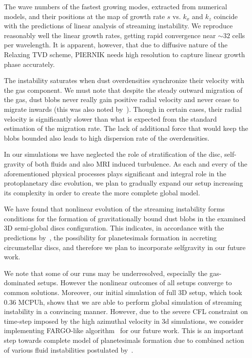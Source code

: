 \par The wave numbers of the fastest growing modes, extracted from numerical
models, and their positions at  the  map of growth rate  $s$ vs. $k_x$ and $k_z$
coincide with the predictions of linear analysis of streaming instability. We
reproduce reasonably well the linear growth rates, getting rapid convergence
near $\sim 32$ cells per wavelength. It is apparent, however,  that due to
diffusive nature of the Relaxing TVD scheme, PIERNIK needs high resolution to
capture linear growth phase accurately.

\par The instability saturates when dust overdensities synchronize their
velocity with the gas component. We must note that despite the steady outward
migration of the gas, dust blobs never really gain positive radial velocity and
never cease to migrate inwards (this was also noted by~\cite{JY07}). Though in
certain cases, their radial velocity is significantly slower than what is
expected from the standard estimation of the migration rate. The lack of
additional force that would keep the blobs bounded also leads to high dispersion
rate of the overdensities.

\par In our simulations we have neglected the role of stratification of the
disc, self-gravity of both fluids and also MRI induced turbulence. As each and
every of the aforementioned physical processes plays significant and integral
role in the protoplanetary disc evolution, we plan to gradually expand our setup
increasing its complexity in order to create the more complete global model.

\par We have found that nonlinear evolution of  the streaming instability forms
conditions for the formation  of gravitationally bound dust blobs in the
examined 3D semi-global discs configuration.  This indicates, in accordance with
the predictions by~\citet{J07}, the possibility  for  planetesimals formation in
accreting circumstellar discs,  and therefore we plan to incorporate selfgravity
in our future work.

\par We note that some of our runs may be underresolved, especially the
gas-dominated setups. However the nonlinear outcomes of all setups converge to
common solutions. Moreover, our initial simulation of full 3D setup, which took
0.36 MCPUh, shows that we are able to perform global simulation of streaming
instability in a convincing manner. 
However, due to the severe CFL constraint on time-step imposed by the high
azimuthal velocity in 3d simulations, we consider implementing {\sc FARGO}-like
algorithm~\cite{M00} for our future work.
This is an important step towards complete model of planetesimals formation due
to combined action of various fluid instabilities postulated by~\citet{J07}. 
